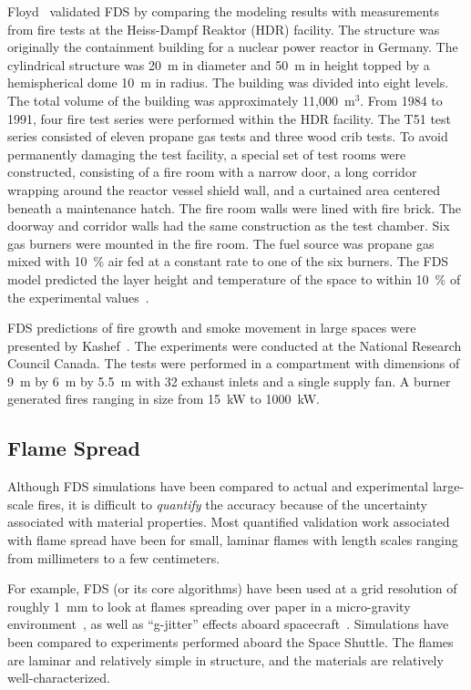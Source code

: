 Floyd~\cite{Floyd:5,Floyd:6} validated  FDS by comparing  the modeling results with  measurements from fire tests at  the Heiss-Dampf Reaktor (HDR)
facility.  The structure was originally the containment building for a nuclear power reactor  in Germany. The cylindrical structure was 20~m in
diameter and  50~m in height  topped by a  hemispherical dome 10~m  in radius.   The building  was divided  into eight  levels.  The total  volume of
the building  was approximately  11,000~m$^3$.  From 1984  to 1991, four  fire test  series were  performed within  the HDR facility.  The T51  test
series consisted of eleven  propane gas tests and three  wood crib  tests.  To avoid  permanently damaging  the test facility, a special set of  test
rooms were constructed, consisting of a fire  room with a narrow  door, a long corridor  wrapping around the reactor vessel  shield wall, and  a
curtained area centered  beneath a maintenance  hatch.   The  fire   room  walls  were  lined  with  fire brick. The doorway and corridor walls had
the same construction as the test chamber. Six gas burners were mounted in the fire room.  The fuel source was propane gas mixed with  10~\% air fed
at a constant rate to one of the  six burners.
The FDS model predicted the  layer height and temperature of the space to within 10~\% of the experimental values~\cite{Floyd:5}.

FDS predictions of fire growth and smoke movement in large spaces were presented by  Kashef~\cite{Kashef:1}.  The experiments  were conducted at the
National Research Council  Canada.  The tests were performed in a compartment with  dimensions of 9~m by 6~m by  5.5~m with 32 exhaust inlets and a
single supply fan.  A burner  generated fires ranging in size  from 15~kW  to 1000~kW.


\subsection{Flame Spread}
\label{flame spread}

Although FDS simulations have been compared to actual and experimental large-scale fires, it is difficult to {\em quantify} the accuracy because of
the uncertainty associated with material properties. Most quantified validation work associated with flame spread have been for small, laminar flames with
length scales ranging from millimeters to a few centimeters.

For example, FDS (or its core algorithms) have been
used at a grid resolution of roughly 1~mm to look at flames spreading over paper in a micro-gravity
environment~\cite{McGrattan:C&F1996,Kashiwagi:CS1996,Mell:CS98,Mell:CS00,Prasad:CS2002,Nakamura:C&F2002},
as well as ``g-jitter'' effects aboard spacecraft~\cite{Mell:g-jitter}.
Simulations have been compared to experiments performed aboard the
Space Shuttle.  The flames are laminar and relatively simple in
structure, and the materials are relatively well-characterized.

